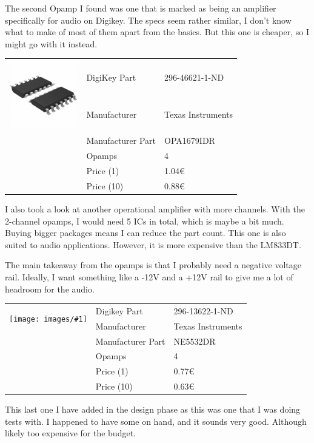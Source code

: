 \documentclass[a4paper]{article}
\makeatletter
\newenvironment{partdisplay}[1]{
\begin{center}
\begin{tabular}{@{}p{3cm}p{3cm}p{4.5cm}@{}}
\multirow{2}{3cm}{\texttt{[image: images/\#1]}}}{
\end{tabular}
\end{center}}
\makeatother
\begin{document}
The second Opamp I found was one that is marked as being an amplifier specifically for audio on Digikey. The specs seem rather similar, I don't know what to make of most of them apart from the basics. But this one is cheaper, so I might go with it instead.

\begin{center}
\begin{tabular}{@{}p{3cm}p{3cm}p{3cm}@{}}
\multirow{2}{3cm}{\includegraphics[width=3cm]{images/soic14}}
& DigiKey Part & 296-46621-1-ND\\
& Manufacturer & Texas Instruments\\
& Manufacturer Part & OPA1679IDR\\
& Opamps & 4\\
& Price (1) & 1.04€\\
& Price (10) & 0.88€\\
\end{tabular}
\end{center}

I also took a look at another operational amplifier with more channels. With the 2-channel opamps, I would need 5 ICs in total, which is maybe a bit much. Buying bigger packages means I can reduce the part count. This one is also suited to audio applications. However, it is more expensive than the LM833DT.

The main takeaway from the opamps is that I probably need a negative voltage rail. Ideally, I want something like a -12V and a +12V rail to give me a lot of headroom for the audio.

\begin{partdisplay}{soic8}
& Digikey Part & 296-13622-1-ND\\
& Manufacturer & Texas Instruments\\
& Manufacturer Part & NE5532DR\\
& Opamps & 4\\
& Price (1) & 0.77€\\
& Price (10) & 0.63€\\  
\end{partdisplay}

This last one I have added in the design phase as this was one that I was doing tests with. I happened to have some on hand, and it sounds very good. Although likely too expensive for the budget.
\end{document}
